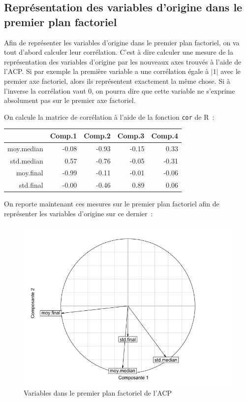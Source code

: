 \documentclass[a4paper,11pt]{report}
\begin{document}
\subsection{Représentation des variables d'origine dans le premier plan factoriel}

Afin de représenter les variables d'origine dans le premier plan factoriel, on va tout d'abord calculer leur corrélation. C'est à dire calculer une mesure de la représentation des variables d'origine par les nouveaux axes trouvés à l'aide de l'ACP. Si par exemple la première variable a une corrélation égale à $|1|$ avec le premier axe factoriel, alors ils représentent exactement la même chose. Si à l'inverse la corrélation vaut $0$, on pourra dire que cette variable ne s'exprime absolument pas sur le premier axe factoriel.

On calcule la matrice de corrélation à l'aide de la fonction \texttt{cor} de R~:
\begin{table}[ht]
	\centering
	\begin{tabular}{r|rrrr}
		& Comp.1 & Comp.2 & Comp.3 & Comp.4 \\ 
		\hline
		moy.median & -0.08 & -0.93 & -0.15 & 0.33 \\ 
		std.median & 0.57 & -0.76 & -0.05 & -0.31 \\ 
		moy.final & -0.99 & -0.11 & -0.01 & -0.06 \\ 
		std.final & -0.00 & -0.46 & 0.89 & 0.06 \\ 
	\end{tabular}
\end{table}

On reporte maintenant ces mesures sur le premier plan factoriel afin de représenter les variables d'origine sur ce dernier~:
\begin{figure}[H]
	\centering
	\captionsetup{justification=centering, margin=2cm}
	\includegraphics[width=.5\linewidth]{img/2-1-2-variables-premier-plan-factoriel}
	\caption{\scriptsize Variables dans le premier plan factoriel de l'ACP}
	\label{fig:variables_premier_plan_factoriel}
\end{figure}
\end{document}
